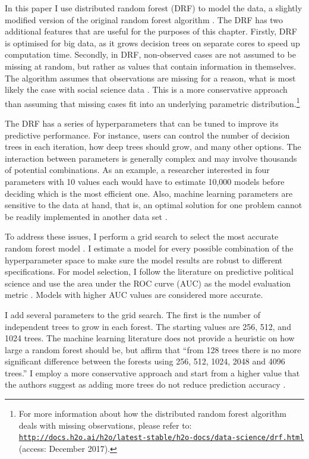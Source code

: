 \documentclass[a4paper,12pt]{article}
\begin{document}
In this paper I use distributed random forest (DRF) to model the data, a slightly modified version of the original random forest algorithm \citep{h2o2017}. The DRF has two additional features that are useful for the purposes of this chapter. Firstly, DRF is optimised for big data, as it grows decision trees on separate cores to speed up computation time. Secondly, in DRF, non-observed cases are not assumed to be missing at random, but rather as values that contain information in themselves. The algorithm assumes that observations are missing for a reason, what is most likely the case with social science data \citep{lall2016multiple}. This is a more conservative approach than assuming that missing cases fit into an underlying parametric distribution.\footnote{For more information about how the distributed random forest algorithm deals with missing observations, please refer to: \href{http://docs.h2o.ai/h2o/latest-stable/h2o-docs/data-science/drf.html}{\texttt{http://docs.h2o.ai/h2o/latest-stable/h2o-docs/data-science/drf.html}} (access: December 2017).}
	
The DRF has a series of hyperparameters that can be tuned to improve its predictive performance. For instance, users can control the number of decision trees in each iteration, how deep trees should grow, and many other options. The interaction between parameters is generally complex and may involve thousands of potential combinations. As an example, a researcher interested in four parameters with 10 values each would have to estimate 10,000 models before deciding which is the most efficient one. Also, machine learning parameters are sensitive to the data at hand, that is, an optimal solution for one problem cannot be readily implemented in another data set \citep{genuer2008random,goldstein2010application,jones2015exploratory}.
	
To address these issues, I perform a grid search to select the most accurate random forest model \citep[123]{cook2017h2o}. I estimate a model for every possible combination of the hyperparameter space to make sure the model results are robust to different specifications. For model selection, I follow the literature on predictive political science and use the area under the ROC curve (AUC) as the model evaluation metric \citep[e.g.,][]{hill2014empirical,ward2010perils,ward2013learning}. Models with higher AUC values are considered more accurate.
	
I add several parameters to the grid search. The first is the number of independent trees to grow in each forest. The starting values are 256, 512, and 1024 trees. The machine learning literature does not provide a heuristic on how large a random forest should be, but \citet[166]{oshiro2012many} affirm that ``from 128 trees there is no more significant difference between the forests using 256, 512, 1024, 2048 and 4096 trees.'' I employ a more conservative approach and start from a higher value that the authors suggest as adding more trees do not reduce prediction accuracy \citep[7]{breiman2001statistical}.
	
\end{document}
